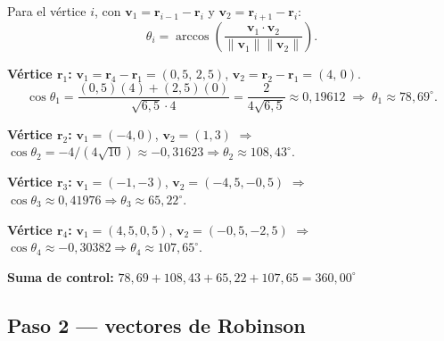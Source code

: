 \documentclass[11pt,a4paper]{article}
\begin{document}
\begin{stepbox}[title={\'Angulos internos (ec. (8) del documento te\'orico)}]
Para el v\'ertice $i$, con $\mathbf{v}_1 = \mathbf{r}_{i-1}-\mathbf{r}_i$ y $\mathbf{v}_2 = \mathbf{r}_{i+1}-\mathbf{r}_i$:
$$\theta_i = \arccos\left(\frac{\mathbf{v}_1\cdot\mathbf{v}_2}{\|\mathbf{v}_1\|\|\mathbf{v}_2\|}\right).$$

\textbf{V\'ertice $\mathbf{r}_1$:} $\mathbf{v}_1 = \mathbf{r}_4-\mathbf{r}_1 = (0{,}5,\,2{,}5)$, $\mathbf{v}_2 = \mathbf{r}_2-\mathbf{r}_1 = (4,\,0)$.
$$\cos\theta_1 = \frac{(0{,}5)(4)+(2{,}5)(0)}{\sqrt{6{,}5}\cdot 4} = \frac{2}{4\sqrt{6{,}5}} \approx 0{,}19612 \;\Rightarrow\; \theta_1 \approx 78{,}69^\circ.$$

\textbf{V\'ertice $\mathbf{r}_2$:} $\mathbf{v}_1=(-4,0)$, $\mathbf{v}_2=(1,3)$ $\Rightarrow$ $\cos\theta_2 = -4/(4\sqrt{10}) \approx -0{,}31623 \Rightarrow \theta_2 \approx 108{,}43^\circ$.

\textbf{V\'ertice $\mathbf{r}_3$:} $\mathbf{v}_1=(-1,-3)$, $\mathbf{v}_2=(-4{,}5,-0{,}5)$ $\Rightarrow$ $\cos\theta_3 \approx 0{,}41976 \Rightarrow \theta_3 \approx 65{,}22^\circ$.

\textbf{V\'ertice $\mathbf{r}_4$:} $\mathbf{v}_1=(4{,}5,0{,}5)$, $\mathbf{v}_2=(-0{,}5,-2{,}5)$ $\Rightarrow$ $\cos\theta_4 \approx -0{,}30382 \Rightarrow \theta_4 \approx 107{,}65^\circ$.

\textbf{Suma de control:} $78{,}69+108{,}43+65{,}22+107{,}65 = 360{,}00^\circ$ \;\checkmark
\end{stepbox}

\subsection{Paso 2 --- vectores de Robinson}
\end{document}

